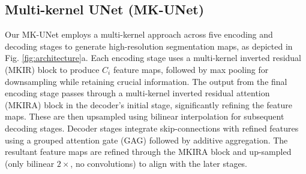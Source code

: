 \subsection{Multi-kernel UNet (MK-UNet)}
Our MK-UNet employs a multi-kernel approach across five encoding and decoding stages to generate high-resolution segmentation maps, as depicted in Fig. \ref{fig:architecture}a. Each encoding stage uses a multi-kernel inverted residual (MKIR) block to produce $C_i$ feature maps, followed by max pooling for downsampling while retaining crucial information. The output from the final encoding stage passes through a multi-kernel inverted residual attention (MKIRA) block in the decoder's initial stage, significantly refining the feature maps. These are then upsampled using bilinear interpolation for subsequent decoding stages. Decoder stages integrate skip-connections with refined features using a grouped attention gate (GAG) followed by additive aggregation. The resultant feature maps are refined through the MKIRA block and up-sampled (only bilinear $2\times$, no convolutions) to align with the later stages. 

